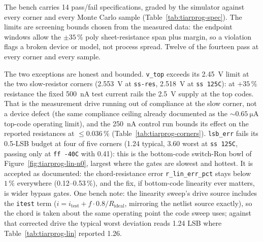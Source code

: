 %

The bench carries 14 pass/fail specifications, graded by the simulator against
every corner and every Monte Carlo sample
(Table~\ref{tab:tiarprog-spec}). The limits are screening bounds chosen from
the measured data: the endpoint windows allow the \(\pm 35\,\%\) poly
sheet-resistance span plus margin, so a violation flags a broken device or
model, not process spread. Twelve of the fourteen pass at every corner and
every sample.

The two exceptions are honest and bounded. \texttt{v\_top} exceeds its
\SI{2.45}{\volt} limit at the two slow-resistor corners
(\SI{2.553}{\volt} at \texttt{ss-res}, \SI{2.518}{\volt} at \texttt{ss 125C}):
at \(+35\,\%\) resistance the fixed \SI{500}{\nano\ampere} test current rails
the \SI{2.5}{\volt} supply at the top codes. That is the measurement drive
running out of compliance at the slow corner, not a device defect (the same
compliance ceiling already documented as the \(\sim\SI{0.65}{\micro\ampere}\)
top-code operating limit), and the \SI{250}{\nano\ampere} control run bounds
its effect on the reported resistances at \(\le 0.036\,\%\)
(Table~\ref{tab:tiarprog-corners}). \texttt{lsb\_err} fails its 0.5-LSB budget
at four of five corners (1.24 typical, 3.60 worst at \texttt{ss 125C}, passing
only at \texttt{ff -40C} with 0.41): this is the bottom-code switch-Ron bowl of
Figure~\ref{fig:tiarprog-lin-n0}, largest where the gates are slowest and
hottest. It is accepted as documented: the chord-resistance error
\texttt{r\_lin\_err\_pct} stays below \(1\,\%\) everywhere
(0.12--0.53\,\%), and the fix, if bottom-code linearity ever matters, is wider
bypass gates. One bench note: the linearity sweep's drive source includes the
\texttt{itest} term (\(i = i_{\mathrm{test}} + f\cdot 0.8/R_{\mathrm{ideal}}\),
mirroring the netlist source exactly), so the chord is taken about the same
operating point the code sweep uses; against that corrected drive the typical
worst deviation reads 1.24 LSB where Table~\ref{tab:tiarprog-lin} reported
1.26.

